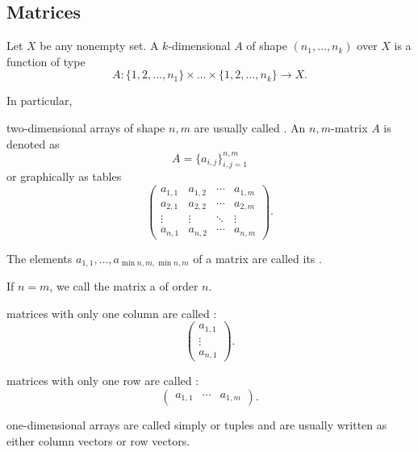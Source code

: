\subsection{Matrices}\label{subsec:matrices}

\begin{definition}\label{def:array}
  Let \( X \) be any nonempty set. A \( k \)-dimensional  \( A \) of shape \( (n_1, \ldots, n_k) \) over \( X \) is a function of type
  \begin{equation*}
    A: \{ 1, 2, \ldots, n_1 \} \times \ldots \times \{ 1, 2, \ldots, n_k \} \to X.
  \end{equation*}

  In particular,
  \begin{defenum}
     two-dimensional arrays of shape \( n, m \) are usually called . An \( n, m \)-matrix \( A \) is denoted as
    \begin{equation*}
      A = \{ a_{i,j} \}_{i,j=1}^{n,m}
    \end{equation*}
    or graphically as tables
    \begin{equation*}
      \begin{pmatrix}
        a_{1,1} & a_{1,2} & \cdots & a_{1,m} \\
        a_{2,1} & a_{2,2} & \cdots & a_{2,m} \\
        \vdots  & \vdots  & \ddots & \vdots \\
        a_{n,1} & a_{n,2} & \cdots & a_{n,m}
      \end{pmatrix}.
    \end{equation*}

    The elements \( a_{1,1}, \ldots, a_{\min{n, m}, \min{n, m}} \) of a matrix are called its .

     If \( n = m \), we call the matrix a  of order \( n \).

     matrices with only one column are called :
    \begin{equation*}
      \begin{pmatrix}
        a_{1,1} \\
        \vdots  \\
        a_{n,1}
      \end{pmatrix}.
    \end{equation*}

     matrices with only one row are called :
    \begin{equation*}
      \begin{pmatrix}
        a_{1,1} & \cdots & a_{1,m}
      \end{pmatrix}.
    \end{equation*}

     one-dimensional arrays are called simply  or tuples and are usually written as either column vectors or row vectors.
  \end{defenum}
\end{definition}

